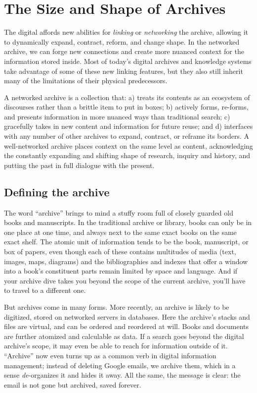 \chapter{The Size and Shape of Archives}


The digital affords new abilities for \emph{linking} or \emph{networking} the archive, allowing it to dynamically expand, contract, reform, and change shape. In the networked archive, we can forge new connections and create more nuanced context for the information stored inside. Most of today's digital archives and knowledge systems take advantage of some of these new linking features, but they also still inherit many of the limitations of their physical predecessors.

A networked archive is a collection that: a) treats its contents as an ecosystem of discourses rather than a brittle item to put in boxes; b) actively forms, re-forms, and presents information in more nuanced ways than traditional search; c) gracefully takes in new content and information for future reuse; and d) interfaces with any number of other archives to expand, contract, or reframe its borders. A well-networked archive places context on the same level as content, acknowledging the constantly expanding and shifting shape of research, inquiry and history, and putting the past in full dialogue with the present.

\section{Defining the archive}

The word ``archive'' brings to mind a stuffy room full of closely guarded old books and manuscripts. In the traditional archive or library, books can only be in one place at one time, and always next to the same exact books on the same exact shelf. The atomic unit of information tends to be the book, manuscript, or box of papers, even though each of these contains multitudes of media (text, images, maps, diagrams) and the bibliographies and indexes that offer a window into a book's constituent parts remain limited by space and language. And if your archive dive takes you beyond the scope of the current archive, you'll have to travel to a different one.

But archives come in many forms. More recently, an archive is likely to be digitized, stored on networked servers in databases. Here the archive's stacks and files are virtual, and can be ordered and reordered at will. Books and documents are further atomized and calculable as data. If a search goes beyond the digital archive's scope, it may even be able to reach for information outside of it. ``Archive'' now even turns up as a common verb in digital information management; instead of deleting Google emails, we archive them, which in a sense \emph{de}-organizes it and hides it away. All the same, the message is clear: the email is not gone but archived, saved forever. 

